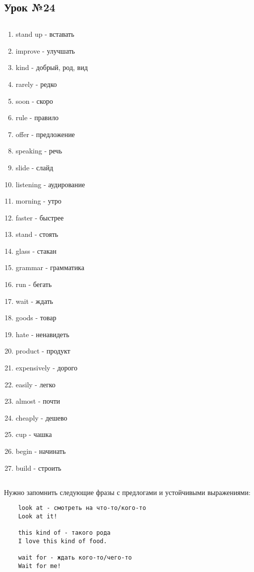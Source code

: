\subsection{Урок №24}

\subsection*{}
\begin{multicols}{2}
    \begin{enumerate}\setlength{\itemsep}{0pt}
        \item stand up - вставать
        \item improve - улучшать
        \item kind - добрый, род, вид
        \item rarely - редко
        \item soon - скоро
        \item rule - правило
        \item offer - предложение
        \item speaking - речь
        \item slide - слайд
        \item listening - аудирование
        \item morning - утро
        \item faster - быстрее
        \item stand - стоять
        \item glass - стакан
        \item grammar - грамматика
        \item run - бегать
        \item wait - ждать
        \item goods - товар
        \item hate - ненавидеть
        \item product - продукт
        \item expensively - дорого
        \item easily - легко
        \item almost - почти
        \item cheaply - дешево
        \item cup - чашка
        \item begin - начинать
        \item build - строить
    \end{enumerate}
\end{multicols}

\subsection*{}
Нужно запомнить следующие фразы с предлогами и устойчивыми выражениями:
\begin{verbatim}
    look at - смотреть на что-то/кого-то
    Look at it!

    this kind of - такого рода
    I love this kind of food.

    wait for - ждать кого-то/чего-то
    Wait for me!
\end{verbatim}